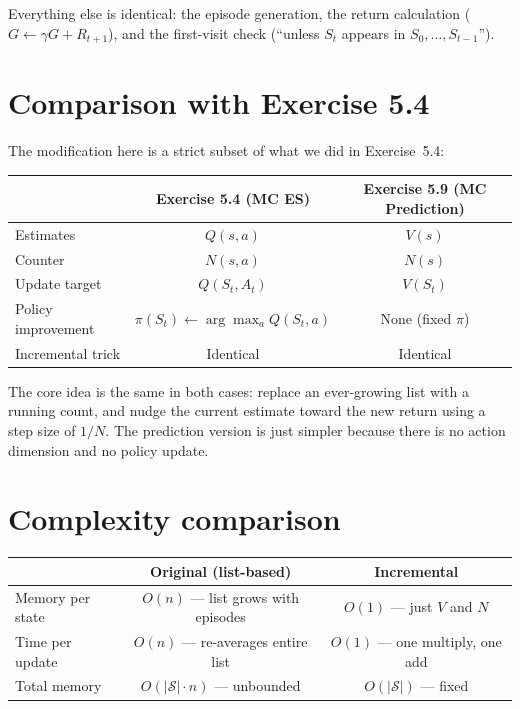 \documentclass[11pt]{article}
\begin{document}
Everything else is identical: the episode generation, the return calculation ($G \leftarrow \gamma G + R_{t+1}$), and the first-visit check (``unless $S_t$ appears in $S_0, \ldots, S_{t-1}$'').

\section*{Comparison with Exercise 5.4}

The modification here is a strict subset of what we did in Exercise~5.4:

\begin{table}[H]
    \centering
    \begin{tabular}{lcc}
        \toprule
        & \textbf{Exercise 5.4 (MC ES)} & \textbf{Exercise 5.9 (MC Prediction)} \\
        \midrule
        Estimates & $Q(s, a)$ & $V(s)$ \\
        Counter & $N(s, a)$ & $N(s)$ \\
        Update target & $Q(S_t, A_t)$ & $V(S_t)$ \\
        Policy improvement & $\pi(S_t) \leftarrow \arg\max_a Q(S_t, a)$ & None (fixed $\pi$) \\
        \addlinespace
        Incremental trick & Identical & Identical \\
        \bottomrule
    \end{tabular}
\end{table}

The core idea is the same in both cases: replace an ever-growing list with a running count, and nudge the current estimate toward the new return using a step size of $1/N$. The prediction version is just simpler because there is no action dimension and no policy update.

\section*{Complexity comparison}

\begin{table}[H]
    \centering
    \begin{tabular}{lcc}
        \toprule
        & \textbf{Original (list-based)} & \textbf{Incremental} \\
        \midrule
        Memory per state & $O(n)$ --- list grows with episodes & $O(1)$ --- just $V$ and $N$ \\
        Time per update & $O(n)$ --- re-averages entire list & $O(1)$ --- one multiply, one add \\
        Total memory & $O(|\mathcal{S}| \cdot n)$ --- unbounded & $O(|\mathcal{S}|)$ --- fixed \\
        \bottomrule
    \end{tabular}
\end{table}
\end{document}
